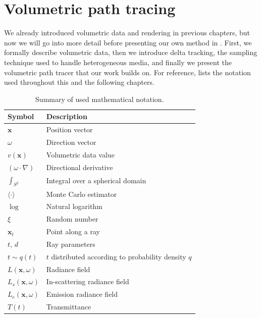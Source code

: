 \chapter{Volumetric path tracing}
\label{ch:vpt}

We already introduced volumetric data and rendering in previous chapters,
but now we will go into more detail before presenting our own method in
. First, we formally describe volumetric data, then we
introduce delta tracking, the sampling technique used to handle heterogeneous
media, and finally we present the volumetric path tracer that our work builds
on. For reference,  lists the notation used throughout this and the following chapters.

\begin{table}[p]
    \renewcommand{\arraystretch}{0.93}
    \centering
    \footnotesize
    \caption{Summary of used mathematical notation.}
    \label{tab:notation}
    \begin{tabular}{ll}
        \textbf{Symbol}                 & \textbf{Description} \\
        \midrule
        $\mathbf{x}$                    & Position vector \\
        $\omega$                        & Direction vector \\
        $v(\mathbf{x})$                 & Volumetric data value \\
        $(\omega \cdot \nabla)$         & Directional derivative \\
        $\int_{S^2}$                    & Integral over a spherical domain \\
        $\langle \cdot \rangle$         & Monte Carlo estimator \\
        $\log$                          & Natural logarithm \\
        $\xi$                           & Random number \\
        $\mathbf{x}_t$                  & Point along a ray \\
        $t$, $d$                        & Ray parameters \\
        $t \sim q(t)$                   
            & $t$ distributed according to probability density $q$ \\
        \hline        
        $L(\mathbf{x}, \omega)$         & Radiance field \\
        $L_s(\mathbf{x}, \omega)$       & In-scattering radiance field \\
        $L_e(\mathbf{x}, \omega)$       & Emission radiance field \\  
        $T(t)$                          & Transmittance \\


\end{tabular}
\end{table}
